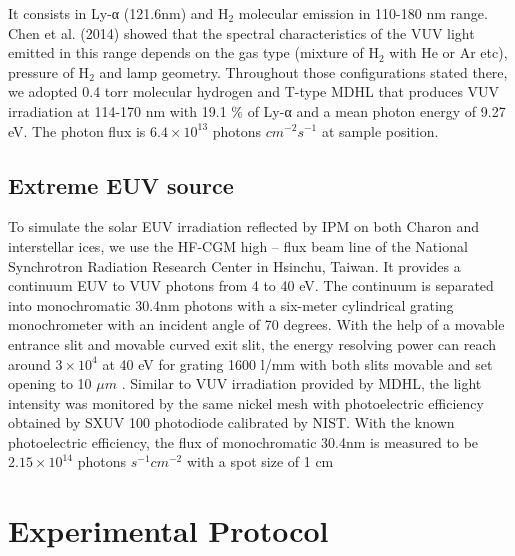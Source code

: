 It consists in Ly-α (121.6nm) and H$_2$ molecular emission in 110-180 nm range. Chen et al. (2014) showed that the spectral characteristics of the VUV light emitted in this range depends on the gas type (mixture of H$_2$ with He or Ar etc), pressure of H$_2$ and lamp geometry. Throughout those configurations stated there, we adopted 0.4 torr molecular hydrogen and T-type MDHL that produces VUV irradiation at 114-170 nm with 19.1 \% of Ly-α and a mean photon energy of 9.27 eV. The photon flux is $6.4 \times 10^{13}$ photons $cm^{-2} s^{-1}$ at sample position.

\subsection{Extreme EUV source}
\label{sec:Extreme_EUV_source}

To simulate the solar EUV irradiation reflected by IPM on both Charon and interstellar ices, we use the HF-CGM high – flux beam line of the National Synchrotron Radiation Research Center in Hsinchu, Taiwan. It provides a continuum EUV to VUV photons from 4 to 40 eV. The continuum is separated into monochromatic 30.4nm photons with a six-meter cylindrical grating monochrometer with an incident angle of 70 degrees. With the help of a movable entrance slit and movable curved exit slit, the energy resolving power can reach around $3 \times 10^4$ at 40 eV for grating 1600 l/mm with both slits movable and set opening to 10 $\mu m$ \cite{hsieh1998design}. Similar to VUV irradiation provided by MDHL, the light intensity was monitored by the same nickel mesh with photoelectric efficiency obtained by SXUV 100 photodiode calibrated by NIST. With the known photoelectric efficiency, the flux of monochromatic 30.4nm is measured to be $2.15 \times 10^{14}$ photons $s^{-1} cm^{-2}$ with a spot size of 1 cm%

\section{Experimental Protocol}
\label{sec:Experimental_Protocol}

